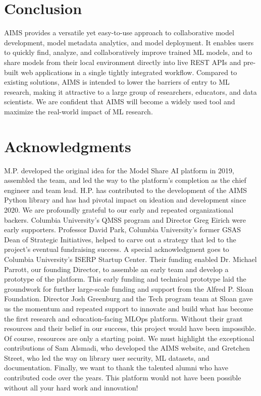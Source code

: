 \section{Conclusion}
AIMS provides a versatile yet easy-to-use approach to collaborative model development, model metadata analytics, and model deployment. It enables users to quickly find, analyze, and collaboratively improve trained ML models, and to share models from their local environment directly into live REST APIs and pre-built web applications in a single tightly integrated workflow. Compared to existing solutions, AIMS is intended to lower the barriers of entry to ML research, making it attractive to a large group of researchers, educators, and data scientists. We are confident that AIMS will become a widely used tool and maximize the real-world impact of ML research.

\newpage
\section*{Acknowledgments}
M.P. developed the original idea for the Model Share AI platform in 2019, assembled the team, and led the way to the platform's completion as the chief engineer and team lead. H.P. has contributed to the development of the AIMS Python library and has had pivotal impact on ideation and development since 2020. We are profoundly grateful to our early and repeated organizational backers. Columbia University's QMSS program and Director Greg Eirich were early supporters. Professor David Park, Columbia University’s former GSAS Dean of Strategic Initiatives, helped to carve out a strategy that led to the project’s eventual fundraising success. A special acknowledgment goes to Columbia University's ISERP Startup Center. Their funding enabled Dr. Michael Parrott, our founding Director, to assemble an early team and develop a prototype of the platform. This early funding and technical prototype laid the groundwork for further large-scale funding and support from the Alfred P. Sloan Foundation. Director Josh Greenburg and the Tech program team at Sloan gave us the momentum and repeated support to innovate and build what has become the first research and education-facing MLOps platform. Without their grant resources and their belief in our success, this project would have been impossible. Of course, resources are only a starting point. We must highlight the exceptional contributions of Sam Alsmadi, who developed the AIMS website, and Gretchen Street, who led the way on library user security, ML datasets, and documentation. Finally, we want to thank the talented alumni who have contributed code over the years. This platform would not have been possible without all your hard work and innovation!
